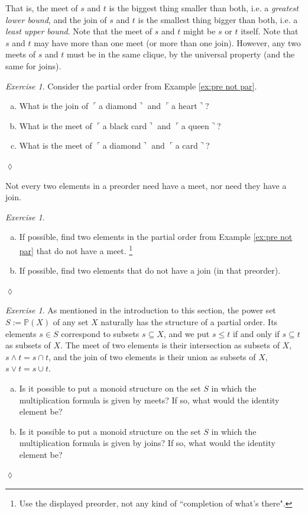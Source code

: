 \documentclass{book}
\def\tn{\textnormal}
\def\PP{{\mathbb P}}
\def\ss{\subseteq}
\newcommand{\fakebox}[1]{\tn{$\ulcorner$#1$\urcorner$}}
\theoremstyle{remark}
\newtheorem{exc}[subsubsection]{Exercise}
\newenvironment{exercise}{\begin{exc}}{\hspace*{\fill}$\lozenge$\end{exc}}
\theoremstyle{definition}
\def\sexc{\begin{enumerate}[a.)]\setlength{\itemsep}{.1cm}\setlength{\parskip}{.1cm}\item}
\def\next{\item}
\def\endsexc{\end{enumerate}}
\begin{document}
That is, the meet of $s$ and $t$ is the biggest thing smaller than both, i.e. a {\em greatest lower bound}, and the join of $s$ and $t$ is the smallest thing bigger than both, i.e. a {\em least upper bound}. Note that the meet of $s$ and $t$ might be $s$ or $t$ itself.  Note that $s$ and $t$ may have more than one meet (or more than one join). However, any two meets of $s$ and $t$ must be in the same clique, by the universal property (and the same for joins).

\begin{exercise}
Consider the partial order from Example \ref{ex:pre not par}. 
\sexc What is the join of \fakebox{a diamond} and \fakebox{a heart}? 
\next What is the meet of \fakebox{a black card} and \fakebox{a queen}? 
\next What is the meet of \fakebox{a diamond} and \fakebox{a card}?
\endsexc
\end{exercise}

Not every two elements in a preorder need have a meet, nor need they have a join. 

\begin{exercise}\label{exc:not all meets and joins}~
\sexc If possible, find two elements in the partial order from Example \ref{ex:pre not par} that do not have a meet.
\footnote{Use the displayed preorder, not any kind of ``completion of what's there".} 
\next If possible, find two elements that do not have a join (in that preorder).
\endsexc
\end{exercise}

\begin{exercise}
As mentioned in the introduction to this section, the power set $S:=\PP(X)$ of any set $X$ naturally has the structure of a partial order. Its elements $s\in S$ correspond to subsets $s\ss X$, and we put $s\leq t$ if and only if $s\ss t$ as subsets of $X$. The meet of two elements is their intersection as subsets of $X$, $s\wedge t= s\cap t$, and the join of two elements is their union as subsets of $X$, $s\vee t=s\cup t$.
\sexc Is it possible to put a monoid structure on the set $S$ in which the multiplication formula is given by meets? If so, what would the identity element be?
\next Is it possible to put a monoid structure on the set $S$ in which the multiplication formula is given by joins? If so, what would the identity element be?
\endsexc
\end{exercise}
\end{document}
